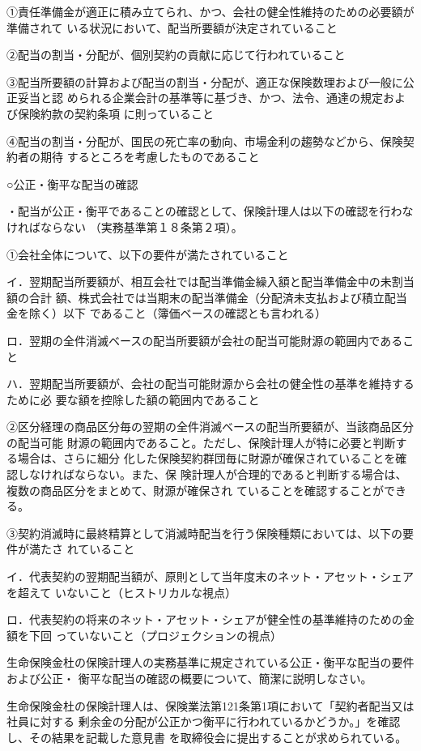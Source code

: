 \documentclass[report,gutter=10mm,fore-edge=10mm,uplatex,dvipdfmx]{jlreq}
\begin{document}
①責任準備金が適正に積み立てられ、かつ、会社の健全性維持のための必要額が準備されて
いる状況において、配当所要額が決定されていること

②配当の割当・分配が、個別契約の貢献に応じて行われていること

③配当所要額の計算および配当の割当・分配が、適正な保険数理および一般に公正妥当と認
められる企業会計の基準等に基づき、かつ、法令、通達の規定および保険約款の契約条項
に則っていること

④配当の割当・分配が、国民の死亡率の動向、市場金利の趨勢などから、保険契約者の期待
するところを考慮したものであること

○公正・衡平な配当の確認

・配当が公正・衡平であることの確認として、保険計理人は以下の確認を行わなければならない
（実務基準第１８条第２項）。

①会社全体について、以下の要件が満たされていること

イ．翌期配当所要額が、相互会社では配当準備金繰入額と配当準備金中の未割当額の合計
額、株式会社では当期末の配当準備金（分配済未支払および積立配当金を除く）以下
であること（簿価ベースの確認とも言われる）

ロ．翌期の全件消滅ベースの配当所要額が会社の配当可能財源の範囲内であること

ハ．翌期配当所要額が、会社の配当可能財源から会社の健全性の基準を維持するために必
要な額を控除した額の範囲内であること

②区分経理の商品区分毎の翌期の全件消滅ベースの配当所要額が、当該商品区分の配当可能
財源の範囲内であること。ただし、保険計理人が特に必要と判断する場合は、さらに細分
化した保険契約群団毎に財源が確保されていることを確認しなければならない。また、保
険計理人が合理的であると判断する場合は、複数の商品区分をまとめて、財源が確保され
ていることを確認することができる。

③契約消滅時に最終精算として消滅時配当を行う保険種類においては、以下の要件が満たさ
れていること

イ．代表契約の翌期配当額が、原則として当年度末のネット・アセット・シェアを超えて
いないこと（ヒストリカルな視点）

ロ．代表契約の将来のネット・アセット・シェアが健全性の基準維持のための金額を下回
っていないこと（プロジェクションの視点）

生命保険金杜の保険計理人の実務基準に規定されている公正・衡平な配当の要件および公正・
衡平な配当の確認の概要について、簡潔に説明しなさい。

\answer{}
生命保険金杜の保険計理人は、保険業法第121条第1項において「契約者配当又は社員に対する
剰余金の分配が公正かつ衡平に行われているかどうか。」を確認し、その結果を記載した意見書
を取締役会に提出することが求められている。
\end{document}

